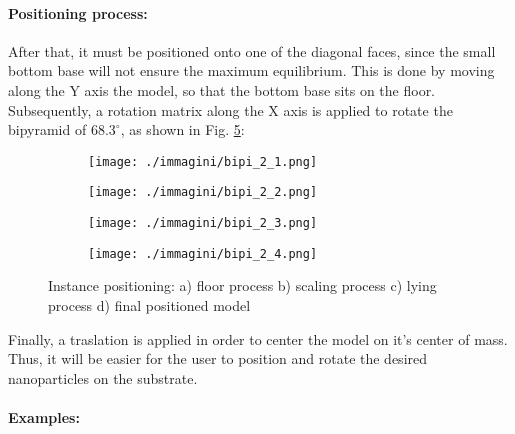 \paragraph{Positioning process: }

After that, it must be positioned onto one of the diagonal faces, since the small bottom base will not ensure the maximum equilibrium. This is done by moving along the Y axis the model, so that the bottom base sits on the floor. Subsequently, a rotation matrix along the X axis is applied to rotate the bipyramid of $68.3^{\circ}$, as shown in Fig. \ref{fig:bipyramids_positioning}:

\begin{figure}[ht]
    \centering
    \begin{subfigure}[b]{0.22\textwidth}
        \texttt{[image: ./immagini/bipi\_2\_1.png]}
        \caption{}
        \label{fig:bipyramids_positioning1}
    \end{subfigure}
    \hfill
    \begin{subfigure}[b]{0.22\textwidth}
        \texttt{[image: ./immagini/bipi\_2\_2.png]}
        \caption{}
        \label{fig:bipyramids_positioning2}
    \end{subfigure}
    \hfill
    \begin{subfigure}[b]{0.22\textwidth}
        \texttt{[image: ./immagini/bipi\_2\_3.png]}
        \caption{}
        \label{fig:bipyramids_positioning3}
    \end{subfigure}
    \hfill
    \begin{subfigure}[b]{0.22\textwidth}
        \texttt{[image: ./immagini/bipi\_2\_4.png]}
        \caption{}
        \label{fig:bipyramids_positioning4}
    \end{subfigure}
    \caption{Instance positioning: a) floor process b) scaling process c) lying process d) final positioned model}
    \label{fig:bipyramids_positioning}
\end{figure}


\newpage

Finally, a traslation is applied in order to center the model on it's center of mass. Thus, it will be easier for the user to position and rotate the desired nanoparticles on the substrate.

\paragraph{Examples: }

